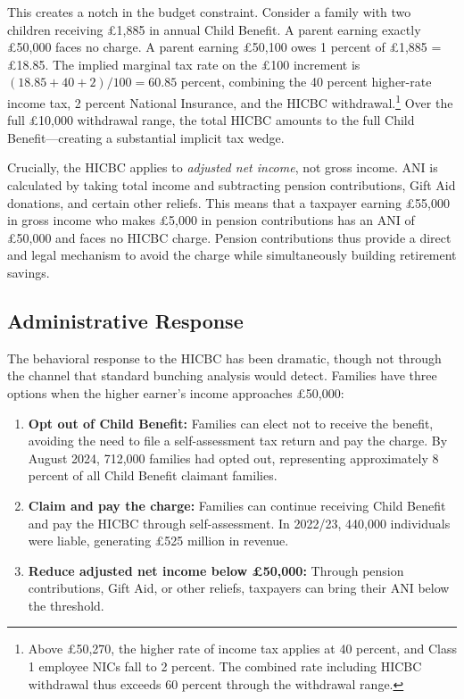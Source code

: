 \documentclass[12pt]{article}
\begin{document}
This creates a notch in the budget constraint. Consider a family with two children receiving \pounds1,885 in annual Child Benefit. A parent earning exactly \pounds50,000 faces no charge. A parent earning \pounds50,100 owes 1 percent of \pounds1,885 = \pounds18.85. The implied marginal tax rate on the \pounds100 increment is $(18.85 + 40 + 2) / 100 = 60.85$ percent, combining the 40 percent higher-rate income tax, 2 percent National Insurance, and the HICBC withdrawal.\footnote{Above \pounds50,270, the higher rate of income tax applies at 40 percent, and Class 1 employee NICs fall to 2 percent. The combined rate including HICBC withdrawal thus exceeds 60 percent through the withdrawal range.} Over the full \pounds10,000 withdrawal range, the total HICBC amounts to the full Child Benefit---creating a substantial implicit tax wedge.

Crucially, the HICBC applies to \emph{adjusted net income}, not gross income. ANI is calculated by taking total income and subtracting pension contributions, Gift Aid donations, and certain other reliefs. This means that a taxpayer earning \pounds55,000 in gross income who makes \pounds5,000 in pension contributions has an ANI of \pounds50,000 and faces no HICBC charge. Pension contributions thus provide a direct and legal mechanism to avoid the charge while simultaneously building retirement savings.

\subsection{Administrative Response}

The behavioral response to the HICBC has been dramatic, though not through the channel that standard bunching analysis would detect. Families have three options when the higher earner's income approaches \pounds50,000:

\begin{enumerate}
    \item \textbf{Opt out of Child Benefit:} Families can elect not to receive the benefit, avoiding the need to file a self-assessment tax return and pay the charge. By August 2024, 712,000 families had opted out, representing approximately 8 percent of all Child Benefit claimant families.
    \item \textbf{Claim and pay the charge:} Families can continue receiving Child Benefit and pay the HICBC through self-assessment. In 2022/23, 440,000 individuals were liable, generating \pounds525 million in revenue.
    \item \textbf{Reduce adjusted net income below \pounds50,000:} Through pension contributions, Gift Aid, or other reliefs, taxpayers can bring their ANI below the threshold.
\end{enumerate}
\end{document}
